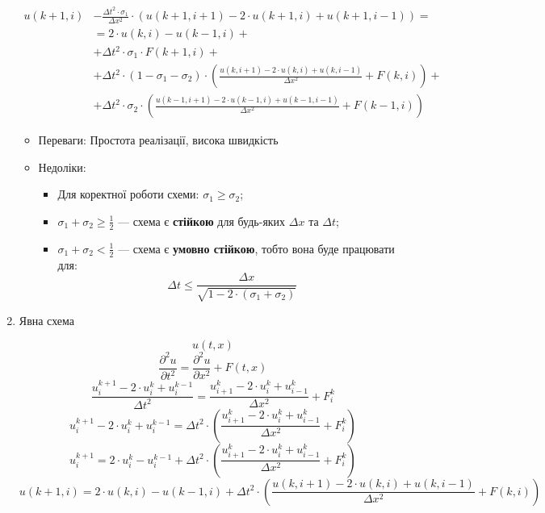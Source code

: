 \documentclass{article}
\begin{document}
\begin{enumerate}
                \begin{align*}
                    u(k+1, i) & - \frac{\Delta{t}^2 \cdot \sigma_1}{\Delta{x}^2} \cdot \left(u(k+1, i+1) - 2 \cdot u(k+1, i) + u(k+1, i-1)\right) = \\
                    & = 2 \cdot u(k, i) - u(k-1, i)  + \\
                    & + \Delta{t}^2 \cdot \sigma_1 \cdot F(k+1, i) + \\
                    & + \Delta{t}^2 \cdot \left(1 - \sigma_1 - \sigma_2 \right) \cdot \left(\frac{u(k, i+1) - 2 \cdot u(k, i) + u(k, i-1)}{\Delta{x}^2} + F(k, i)\right) + \\
                    & + \Delta{t}^2 \cdot \sigma_2 \cdot \left(\frac{u(k-1, i+1) - 2 \cdot u(k-1, i) + u(k-1, i-1)}{\Delta{x}^2} + F(k-1, i)\right)
                \end{align*}

                \begin{itemize}
                    \item Переваги: Простота реалізації, висока швидкість
                    \item Недоліки:
                        \begin{itemize}
                            \item Для коректної роботи схеми: $ \sigma_1 \geq \sigma_2 $;
                            \item $ \sigma_1 + \sigma_2 \geq \frac{1}{2} $ --- схема є \textbf{стійкою} для будь-яких $ \Delta{x} $ та $ \Delta{t} $;
                            \item $ \sigma_1 + \sigma_2 < \frac{1}{2} $ --- схема є \textbf{умовно стійкою}, тобто вона буде працювати для:
                            $$ \Delta{t} \leq \frac{\Delta{x}}{\sqrt{1 - 2 \cdot(\sigma_1 + \sigma_2)}} $$
                    \end{itemize}
                \end{itemize}

            \item 
                Явна схема

                $$ u(t, x) $$
                $$ \frac{\partial^2{u}}{\partial{t^2}} = \frac{\partial^2{u}}{\partial{x^2}} + F(t, x) $$
                $$ \frac{u_i^{k+1} - 2 \cdot u_i^{k} + u_i^{k-1}}{\Delta{t}^2} = \frac{u_{i+1}^{k} - 2 \cdot u_i^{k} + u_{i-1}^{k}}{\Delta{x}^2} + F_i^{k} $$
                $$ u_i^{k+1} - 2 \cdot u_i^{k} + u_i^{k-1} = \Delta{t}^2 \cdot \left( \frac{u_{i+1}^{k} - 2 \cdot u_i^{k} + u_{i-1}^{k}}{\Delta{x}^2} + F_i^{k} \right) $$
                $$ u_i^{k+1} = 2 \cdot u_i^{k} - u_i^{k-1} + \Delta{t}^2 \cdot \left( \frac{u_{i+1}^{k} - 2 \cdot u_i^{k} + u_{i-1}^{k}}{\Delta{x}^2} + F_i^{k} \right) $$
                $$ u(k+1, i) = 2 \cdot u(k, i) - u(k-1, i) + \Delta{t}^2 \cdot \left( \frac{u(k, i+1) - 2 \cdot u(k, i) + u(k, i-1)}{\Delta{x}^2} + F(k, i) \right) $$


\end{enumerate}
\end{document}

